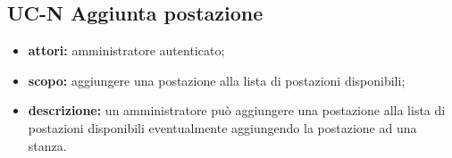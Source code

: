 \subsection{UC-N Aggiunta postazione}
\begin{itemize}
    \item \textbf{attori:} amministratore autenticato;
    \item \textbf{scopo:} aggiungere una postazione alla lista di postazioni disponibili;
    \item \textbf{descrizione:} un amministratore pu\`{o} aggiungere una postazione alla lista di postazioni disponibili eventualmente aggiungendo la postazione ad una stanza.
\end{itemize}